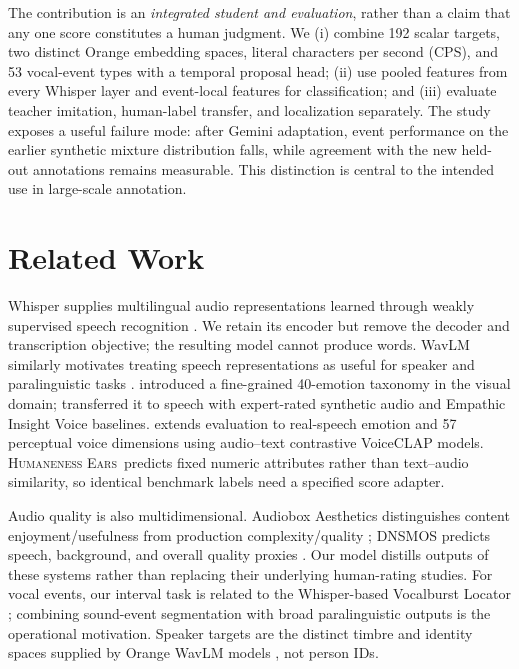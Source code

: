 \documentclass{article}
\newcommand{\he}{\textsc{Humaneness Ears}}
\begin{document}
The contribution is an \emph{integrated student and evaluation}, rather than a claim that any one score constitutes a human judgment. We (i) combine 192 scalar targets, two distinct Orange embedding spaces, literal characters per second (CPS), and 53 vocal-event types with a temporal proposal head; (ii) use pooled features from every Whisper layer and event-local features for classification; and (iii) evaluate teacher imitation, human-label transfer, and localization separately. The study exposes a useful failure mode: after Gemini adaptation, event performance on the earlier synthetic mixture distribution falls, while agreement with the new held-out annotations remains measurable. This distinction is central to the intended use in large-scale annotation.

\section{Related Work}
Whisper supplies multilingual audio representations learned through weakly supervised speech recognition \citep{radford2023whisper}. We retain its encoder but remove the decoder and transcription objective; the resulting model cannot produce words. WavLM similarly motivates treating speech representations as useful for speaker and paralinguistic tasks \citep{chen2022wavlm}. \citet{schuhmann2025emonetface} introduced a fine-grained 40-emotion taxonomy in the visual domain; \citet{schuhmann2025emonetvoice} transferred it to speech with expert-rated synthetic audio and Empathic Insight Voice baselines. \citet{schuhmann2026voicenet} extends evaluation to real-speech emotion and 57 perceptual voice dimensions using audio--text contrastive VoiceCLAP models. \he\ predicts fixed numeric attributes rather than text--audio similarity, so identical benchmark labels need a specified score adapter.

Audio quality is also multidimensional. Audiobox Aesthetics distinguishes content enjoyment/usefulness from production complexity/quality \citep{tjandra2025audiobox}; DNSMOS predicts speech, background, and overall quality proxies \citep{reddy2021dnsmos}. Our model distills outputs of these systems rather than replacing their underlying human-rating studies. For vocal events, our interval task is related to the Whisper-based Vocalburst Locator \citep{laion2026locator}; combining sound-event segmentation with broad paralinguistic outputs is the operational motivation. Speaker targets are the distinct timbre and identity spaces supplied by Orange WavLM models \citep{orange2026timbre,orange2026identity}, not person IDs.
\end{document}
